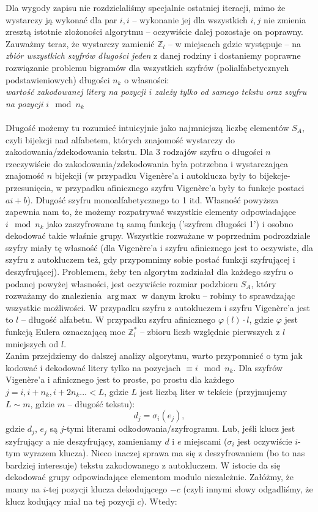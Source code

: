 \documentclass[a4paper]{article}
\DeclareMathOperator*{\argmax}{arg\,max}
\theoremstyle{defn}
\theoremstyle{theorem}
\theoremstyle{lemma}
\theoremstyle{cor}
\theoremstyle{fact}
\begin{document}
Dla wygody zapisu nie rozdzielaliśmy specjalnie ostatniej iteracji, mimo że wystarczy ją wykonać dla par $i,i$ – wykonanie jej dla wszystkich $i,j$ nie zmienia zresztą istotnie złożoności algorytmu – oczywiście dalej pozostaje on poprawny.
Zauważmy teraz, że wystarczy zamienić $\mathbb{Z}_l$ – w miejscach gdzie występuje – na \textit{zbiór wszystkich szyfrów długości jeden} z danej rodziny i dostaniemy poprawne rozwiązanie problemu bigramów dla wszystkich szyfrów (polialfabetycznych podstawieniowych) długości $n_k$ o własności:\\
\textit{wartość zakodowanej litery na pozycji $i$ zależy tylko od samego tekstu oraz szyfru na pozycji $i \mod n_k$}\\\\
Długość możemy tu rozumieć intuicyjnie jako najmniejszą liczbę elementów $S_A$, czyli bijekcji nad alfabetem, których znajomość wystarczy do zakodowania/zdekodowania tekstu. Dla 3 rodzajów szyfru o długości $n$ rzeczywiście do zakodowania/zdekodowania była potrzebna i wystarczająca znajomość $n$ bijekcji (w przypadku Vigenère'a i autoklucza były to bijekcje-przesunięcia, w przypadku afinicznego szyfru Vigenère'a były to funkcje postaci $ai+b$). Długość szyfru monoalfabetycznego to 1 itd. Własność powyższa zapewnia nam to, że możemy rozpatrywać wszystkie elementy odpowiadające $i \mod n_k$ jako zaszyfrowane tą samą funkcją ('szyfrem długości 1') i osobno dekodować takie właśnie grupy. Wszystkie rozważane w poprzednim podrozdziale szyfry miały tę własność (dla Vigenère'a i szyfru afinicznego jest to oczywiste, dla szyfru z autokluczem też, gdy przypomnimy sobie postać funkcji szyfrującej i deszyfrującej). Problemem, żeby ten algorytm zadziałał dla każdego szyfru o podanej powyżej własności, jest oczywiście rozmiar podzbioru $S_A$, który rozważamy do znalezienia $\argmax$ w danym kroku – robimy to sprawdzając wszystkie możliwości. W przypadku szyfru z autokluczem i szyfru Vigenère'a jest to $l$ – długość alfabetu. W przypadku szyfru afinicznego $\varphi(l) \cdot l$, gdzie $\varphi$ jest funkcją Eulera oznaczającą moc $\mathbb{Z}_l^*$ – zbioru liczb względnie pierwszych z $l$ mniejszych od $l$.\\
Zanim przejdziemy do dalszej analizy algorytmu, warto przypomnieć o tym jak kodować i dekodować litery tylko na pozycjach $\equiv i \mod n_k$.
Dla szyfrów Vigenère'a i afinicznego jest to proste, po prostu dla każdego $j = i, i+n_k, i+2n_k... < L$, gdzie $L$ jest liczbą liter w tekście (przyjmujemy $L \sim m$, gdzie $m$ – długość tekstu):
$$d_j = \sigma_i(e_j),$$
gdzie $d_j$, $e_j$ są $j$-tymi literami odkodowania/szyfrogramu. Lub, jeśli klucz jest szyfrujący a nie deszyfrujący, zamieniamy $d$ i $e$ miejscami ($\sigma_i$ jest oczywiście $i$-tym wyrazem klucza). Nieco inaczej sprawa ma się z deszyfrowaniem (bo to nas bardziej interesuje) tekstu zakodowanego z autokluczem. W istocie da się dekodować grupy odpowiadające elementom modulo niezależnie. Załóżmy, że mamy na $i$-tej pozycji klucza dekodującego $-c$ (czyli innymi słowy odgadliśmy, że klucz kodujący miał na tej pozycji $c$). Wtedy:
\end{document}
